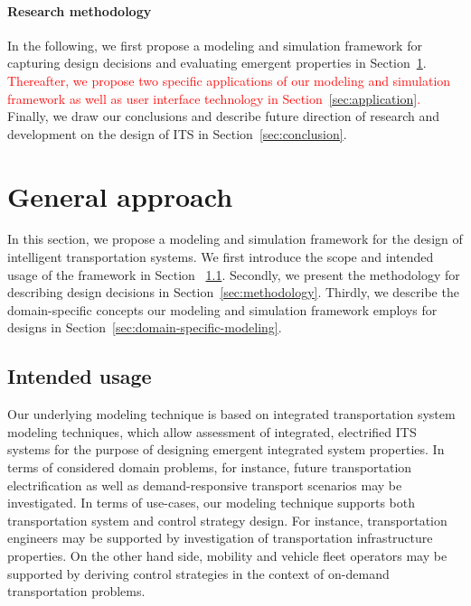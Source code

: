 \documentclass[10pt,twocolumn]{article}
\begin{document}
\paragraph{Research methodology}

In the following, we first propose a modeling and simulation framework for capturing design decisions and evaluating emergent properties in Section~\ref{sec:approach}.
\textcolor{red}{Thereafter, we propose two specific applications of our modeling and simulation framework as well as user interface technology in Section~\ref{sec:application}.}
Finally, we draw our conclusions and describe future direction of research and development on the design of ITS in Section~\ref{sec:conclusion}. 

\section{General approach}
\label{sec:approach}

In this section, we propose a modeling and simulation framework for the design of intelligent transportation systems.
We first introduce the scope and intended usage of the framework in Section ~\ref{sec:scope}.
Secondly, we present the methodology for describing design decisions in Section~\ref{sec:methodology}.
Thirdly, we describe the domain-specific concepts our modeling and simulation framework employs for designs in Section~\ref{sec:domain-specific-modeling}.

\subsection{Intended usage}
\label{sec:scope}

Our underlying modeling technique is based on integrated transportation system modeling techniques, which allow assessment of integrated, electrified ITS systems for the purpose of designing emergent integrated system properties.
In terms of considered domain problems, for instance, future transportation electrification as well as demand-responsive transport scenarios may be investigated.
In terms of use-cases, our modeling technique supports both transportation system and control strategy design.
For instance, transportation engineers may be supported by investigation of transportation infrastructure properties.
On the other hand side, mobility and vehicle fleet operators may be supported by deriving control strategies in the context of on-demand transportation problems.
\end{document}
